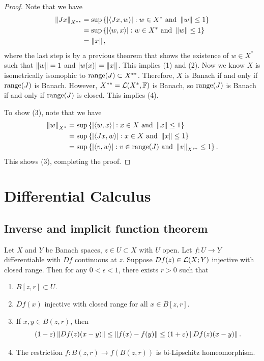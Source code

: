 \documentclass[a4paper]{article}
\begin{document}
\begin{proof}
Note that we have
\[
\begin{aligned}
\left\lVert Jx\right\rVert_{X^{**}}
&= \sup \left\{ \left\lvert \left\langle Jx, w \right\rangle\right\rvert: w \in X^* \text{ and } \left\lVert w\right\rVert \leq 1 \right\} \\
&= \sup \left\{ \left\lvert \left\langle w, x \right\rangle\right\rvert: w \in X^* \text{ and } \left\lVert w\right\rVert \leq 1 \right\} \\
&= \left\lVert x\right\rVert,
\end{aligned}
\]
where the last step is by a previous theorem that shows
the existence of $w \in X^*$ such that $\left\lVert w\right\rVert = 1$ and
$\left\lvert w(x)\right\rvert = \left\lVert x\right\rVert$. This implies (1) and (2).
Now we know $X$ is isometrically isomophic to $\operatorname{range}(J) \subset
X^{**}$. Therefore, $X$ is Banach if and only if $\operatorname{range}(J)$ is
Banach. However, $X^{**} = \mathcal{L}(X^*, \mathbb{F})$ is Banach, so
$\operatorname{range}(J)$ is Banach if and only if $\operatorname{range}(J)$ is closed.
This implies (4).

To show (3), note that we have
\[
\begin{aligned}
\left\lVert w\right\rVert_{X^*}
&= \sup \left\{ \left\lvert \left\langle w, x \right\rangle\right\rvert : x \in X \text{ and } \left\lVert x\right\rVert \leq 1 \right\} \\
&= \sup \left\{ \left\lvert \left\langle Jx, w \right\rangle\right\rvert : x \in X \text{ and } \left\lVert x\right\rVert \leq 1 \right\} \\
&= \sup \left\{ \left\lvert \left\langle v, w \right\rangle\right\rvert : v \in \operatorname{range}(J) \text{ and } \left\lVert v\right\rVert_{X^{**}} \leq 1 \right\}.
\end{aligned}
\]
This shows (3), completing the proof.
\end{proof}

\section{Differential Calculus}

\subsection{Inverse and implicit function theorem}

\begin{thm}
Let $X$ and $Y$ be Banach spaces, $z \in U \subset X$
with $U$ open. Let $f: U \to Y$ differentiable with
$Df$ continuous at $z$. Suppose $Df(z) \in \mathcal{L}(X; Y)$
injective with closed range. Then for any $0 < \epsilon < 1$,
there exists $r > 0$ such that
\begin{enumerate}
  \item $B[z, r] \subset U$.
  \item $Df(x)$ injective with closed range for all $x \in
  B[z, r]$.
  \item If $x, y \in B(z, r)$, then
  \[
  (1 - \varepsilon) \left\lVert Df(z) (x - y)\right\rVert
  \leq \left\lVert f(x) - f(y)\right\rVert
  \leq (1 + \varepsilon) \left\lVert Df(z) (x - y)\right\rVert.
  \]
  \item The restriction $f: B(z, r) \to f(B(z, r))$
  is bi-Lipschitz homeomorphism.
\end{enumerate}
\end{thm}
\end{document}
